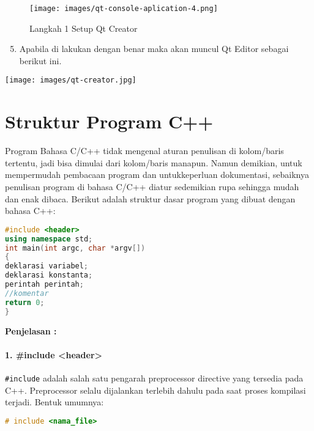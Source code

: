 \begin{figure}[htbp]
\centering
\texttt{[image: images/qt-console-aplication-4.png]}
\caption{Langkah 1 Setup Qt Creator }
\end{figure}

\begin{enumerate}

\setcounter{enumi}{4}

\item
  Apabila di lakukan dengan benar maka akan muncul Qt Editor sebagai
  berikut ini.
\end{enumerate}

\begin{center}

\texttt{[image: images/qt-creator.jpg]}

\end{center}

\section{Struktur Program C++}\label{struktur-program-cpp}

Program Bahasa C/C++ tidak mengenal aturan penulisan di kolom/baris
tertentu, jadi bisa dimulai dari kolom/baris manapun. Namun demikian,
untuk mempermudah pembacaan program dan untukkeperluan dokumentasi,
sebaiknya penulisan program di bahasa C/C++ diatur sedemikian rupa
sehingga mudah dan enak dibaca. Berikut adalah struktur dasar program
yang dibuat dengan bahasa C++:

\begin{lstlisting}[language=c++, caption=Struktur Program C++]
#include <header>  
using namespace std;    
int main(int argc, char *argv[])
{  
deklarasi variabel;   
deklarasi konstanta;  
perintah perintah;  
//komentar  
return 0;  
}  
\end{lstlisting}

\textbf{Penjelasan :}

\paragraph{ 1. \#include <header>}

\texttt{\#include} adalah salah satu pengarah preprocessor directive
yang tersedia pada C++. Preprocessor selalu dijalankan terlebih dahulu
pada saat proses kompilasi terjadi. Bentuk umumnya:

\begin{lstlisting}[language=c++, numbers=none]
# include <nama_file>
\end{lstlisting}

